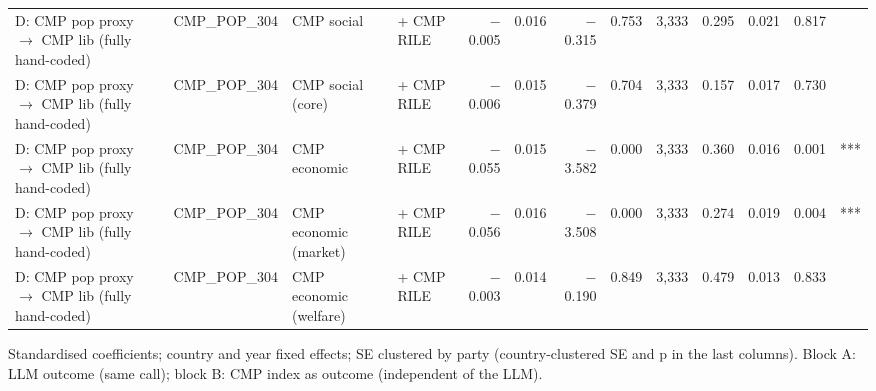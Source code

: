 \begin{table}[ht]
{\begin{tabular}{llllrrrrrrrrl}
D: CMP pop proxy $\rightarrow$ CMP lib (fully hand-coded) & CMP\_POP\_304 & CMP social & + CMP RILE & $-$0.005 & 0.016 & $-$0.315 & 0.753 & 3,333 & 0.295 & 0.021 & 0.817 &  \\
D: CMP pop proxy $\rightarrow$ CMP lib (fully hand-coded) & CMP\_POP\_304 & CMP social (core) & + CMP RILE & $-$0.006 & 0.015 & $-$0.379 & 0.704 & 3,333 & 0.157 & 0.017 & 0.730 &  \\
D: CMP pop proxy $\rightarrow$ CMP lib (fully hand-coded) & CMP\_POP\_304 & CMP economic & + CMP RILE & $-$0.055 & 0.015 & $-$3.582 & 0.000 & 3,333 & 0.360 & 0.016 & 0.001 & *** \\
D: CMP pop proxy $\rightarrow$ CMP lib (fully hand-coded) & CMP\_POP\_304 & CMP economic (market) & + CMP RILE & $-$0.056 & 0.016 & $-$3.508 & 0.000 & 3,333 & 0.274 & 0.019 & 0.004 & *** \\
D: CMP pop proxy $\rightarrow$ CMP lib (fully hand-coded) & CMP\_POP\_304 & CMP economic (welfare) & + CMP RILE & $-$0.003 & 0.014 & $-$0.190 & 0.849 & 3,333 & 0.479 & 0.013 & 0.833 &  \\
\bottomrule
\end{tabular}}
\par\smallskip
\begin{minipage}{\linewidth}\scriptsize Standardised coefficients; country and year fixed effects; SE clustered by party (country-clustered SE and p in the last columns). Block A: LLM outcome (same call); block B: CMP index as outcome (independent of the LLM).\end{minipage}
\end{table}
